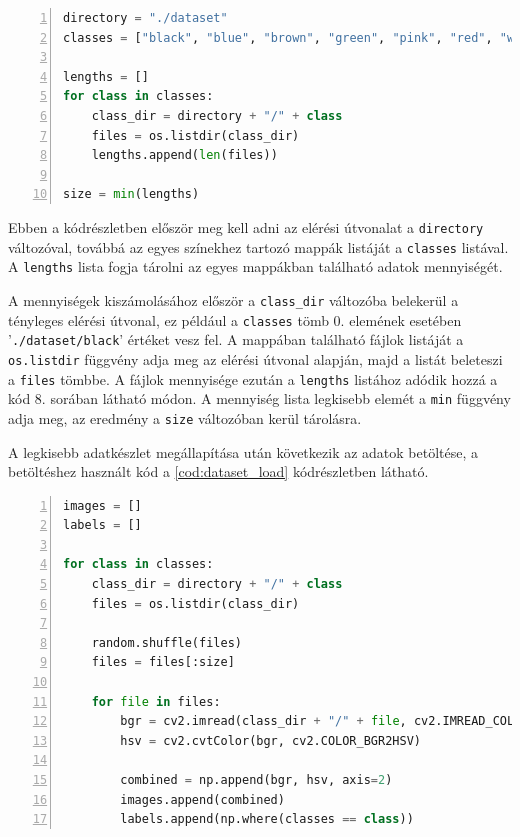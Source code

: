 \begin{codewrapper}
\begin{lstlisting}[language=Python, numbers=left, caption={A legkevesebb elemmel rendelkező adatkészlet megállapítása.}, label={cod:smallest_dataset}]
directory = "./dataset"
classes = ["black", "blue", "brown", "green", "pink", "red", "white", "yellow"]

lengths = []
for class in classes:
    class_dir = directory + "/" + class
    files = os.listdir(class_dir)
    lengths.append(len(files))

size = min(lengths)
\end{lstlisting}
\end{codewrapper}

\par Ebben a kódrészletben először meg kell adni az elérési útvonalat a \lstinline{directory} változóval, továbbá az egyes színekhez tartozó mappák listáját a \lstinline{classes} listával. A \lstinline{lengths} lista fogja tárolni az egyes mappákban található adatok mennyiségét.
\par A mennyiségek kiszámolásához először a \lstinline{class_dir} változóba belekerül a tényleges elérési útvonal, ez például a \lstinline{classes} tömb 0. elemének esetében '\lstinline{./dataset/black}' értéket vesz fel. A mappában található fájlok listáját a \lstinline{os.listdir} függvény adja meg az elérési útvonal alapján, majd a listát beleteszi a \lstinline{files} tömbbe. A fájlok mennyisége ezután a \lstinline{lengths} listához adódik hozzá a kód 8. sorában látható módon. A mennyiség lista legkisebb elemét a \lstinline{min} függvény adja meg, az eredmény a \lstinline{size} változóban kerül tárolásra.
\par A legkisebb adatkészlet megállapítása után következik az adatok betöltése, a betöltéshez használt kód a \ref{cod:dataset_load} kódrészletben látható.

\begin{codewrapper}
\begin{lstlisting}[language=Python, numbers=left, caption={Az adatkészlet betöltése.}, label={cod:dataset_load}]
images = []
labels = []

for class in classes:
    class_dir = directory + "/" + class
    files = os.listdir(class_dir)

    random.shuffle(files)
    files = files[:size]

    for file in files:
        bgr = cv2.imread(class_dir + "/" + file, cv2.IMREAD_COLOR)
        hsv = cv2.cvtColor(bgr, cv2.COLOR_BGR2HSV)

        combined = np.append(bgr, hsv, axis=2)
        images.append(combined)
        labels.append(np.where(classes == class))
\end{lstlisting}
\end{codewrapper}

